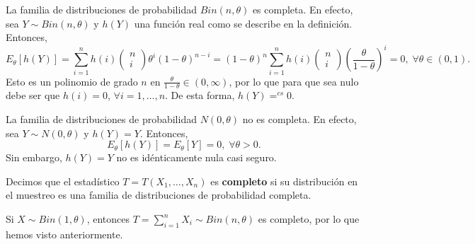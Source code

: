 \begin{eg}
La familia de distribuciones de probabilidad $\displaystyle Bin\left(n,\theta\right) $ es completa. En efecto, sea $\displaystyle Y \sim Bin\left(n,\theta\right) $ y $\displaystyle h\left(Y\right)$ una función real como se describe en la definición. Entonces, 
\[E_{\theta}\left[h\left(Y\right)\right] =\sum^{n}_{i=1}h\left(i\right)\begin{pmatrix} n \\ i \end{pmatrix}\theta^{i}\left(1-\theta\right)^{n-i}=\left(1-\theta\right)^{n}\sum^{n}_{i=1}h\left(i\right)\begin{pmatrix} n\\ i \end{pmatrix}\left(\frac{\theta}{1-\theta}\right)^{i}=0, \; \forall \theta \in \left(0,1\right) .\]
Esto es un polinomio de grado $\displaystyle n $ en $\displaystyle \frac{\theta}{1-\theta} \in \left(0,\infty\right) $, por lo que para que sea nulo debe ser que $\displaystyle h\left(i\right)=0 $, $\displaystyle \forall i = 1, \ldots, n $. De esta forma, $\displaystyle h\left(Y\right)=^{cs}0 $. 
\end{eg}
\begin{eg}
La familia de distribuciones de probabilidad $\displaystyle N\left(0, \theta\right) $ no es completa. En efecto, sea $\displaystyle Y \sim N\left(0, \theta\right) $ y $\displaystyle h\left(Y\right)=Y $. Entonces,
\[E_{\theta}\left[h\left(Y\right)\right] =E_{\theta}\left[Y\right] =0, \; \forall \theta > 0 .\]
Sin embargo, $\displaystyle h\left(Y\right)=Y $ no es idénticamente nula casi seguro. 
\end{eg}
\begin{definition}
Decimos que el estadístico $\displaystyle T = T\left(X_{1}, \ldots, X_{n}\right) $ es \textbf{completo} si su distribución en el muestreo es una familia de distribuciones de probabilidad completa.
\end{definition}
\begin{eg}
Si $\displaystyle X \sim Bin\left(1,\theta\right) $, entonces $\displaystyle T = \sum^{n}_{i = 1}X_{i}\sim Bin\left(n,\theta\right) $ es completo, por lo que hemos visto anteriormente. 
\end{eg}
